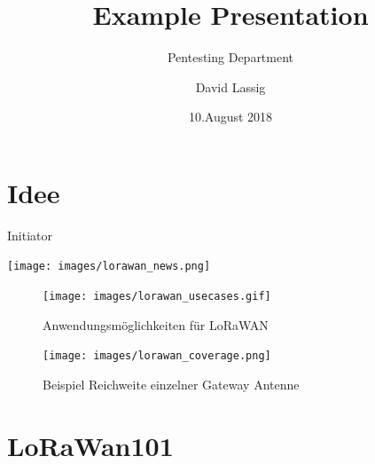 \documentclass[ignorenonframetext,]{beamer}
\title{Example Presentation}
\subtitle{Pentesting Department}
\author{David Lassig}
\date{10.August 2018}
\providecommand{\tightlist}{%
  \setlength{\itemsep}{0pt}\setlength{\parskip}{0pt}}
\begin{document}
\frame{\titlepage}

\hypertarget{idee}{%
\section{Idee}\label{idee}}

\begin{frame}{Initiator}
\protect\hypertarget{initiator}{}

\texttt{[image: images/lorawan\_news.png]}

\end{frame}

\begin{frame}{}
\protect\hypertarget{section}{}

\begin{figure}
\hypertarget{id}{%
\centering
\texttt{[image: images/lorawan\_usecases.gif]}
\caption{Anwendungsmöglichkeiten für LoRaWAN}\label{id}
}
\end{figure}

\end{frame}

\begin{frame}{}
\protect\hypertarget{section-1}{}

\begin{figure}
\hypertarget{id}{%
\centering
\texttt{[image: images/lorawan\_coverage.png]}
\caption{Beispiel Reichweite einzelner Gateway Antenne}\label{id}
}
\end{figure}

\end{frame}

\hypertarget{lorawan101}{%
\section{LoRaWan101}\label{lorawan101}}

\end{document}
